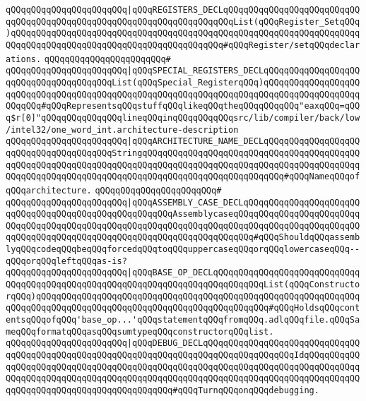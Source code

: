 \verb|qQQqqQQqqQQqqQQqqQQqqQQq|\verb#|qQQqREGISTERS_DECLqQQqqQQqqQQqqQQqqQQqqQQqqQQqqQQqqQQqqQQqqQQqqQQqqQQqqQQqqQQqqQQqqQQqqQQqList(qQQqRegister_SetqQQq)qQQqqQQqqQQqqQQqqQQqqQQqqQQqqQQqqQQqqQQqqQQqqQQqqQQqqQQqqQQqqQQqqQQqqQQqqQQqqQQqqQQqqQQqqQQqqQQqqQQqqQQqqQQqqQQq#\verb|#qQQqRegister/setqQQqdeclarations.|\newline
\verb|qQQqqQQqqQQqqQQqqQQqqQQq#|\newline
\verb|qQQqqQQqqQQqqQQqqQQqqQQq|\verb#|qQQqSPECIAL_REGISTERS_DECLqQQqqQQqqQQqqQQqqQQqqQQqqQQqqQQqqQQqqQQqList(qQQqSpecial_RegisterqQQq)qQQqqQQqqQQqqQQqqQQqqQQqqQQqqQQqqQQqqQQqqQQqqQQqqQQqqQQqqQQqqQQqqQQqqQQqqQQqqQQqqQQqqQQqqQQqqQQq#\verb|#qQQqRepresentsqQQqstuffqQQqlikeqQQqtheqQQqqQQqqQQq"eaxqQQq=qQQq$r[0]"qQQqqQQqqQQqqQQqlineqQQqinqQQqqQQqqQQqsrc/lib/compiler/back/low/intel32/one_word_int.architecture-description|\newline
\verb|qQQqqQQqqQQqqQQqqQQqqQQq|\verb#|qQQqARCHITECTURE_NAME_DECLqQQqqQQqqQQqqQQqqQQqqQQqqQQqqQQqqQQqqQQqStringqQQqqQQqqQQqqQQqqQQqqQQqqQQqqQQqqQQqqQQqqQQqqQQqqQQqqQQqqQQqqQQqqQQqqQQqqQQqqQQqqQQqqQQqqQQqqQQqqQQqqQQqqQQqqQQqqQQqqQQqqQQqqQQqqQQqqQQqqQQqqQQqqQQqqQQqqQQqqQQqqQQqqQQq#\verb|#qQQqNameqQQqofqQQqarchitecture.|\newline
\verb|qQQqqQQqqQQqqQQqqQQqqQQq#|\newline
\verb|qQQqqQQqqQQqqQQqqQQqqQQq|\verb#|qQQqASSEMBLY_CASE_DECLqQQqqQQqqQQqqQQqqQQqqQQqqQQqqQQqqQQqqQQqqQQqqQQqqQQqqQQqAssemblycaseqQQqqQQqqQQqqQQqqQQqqQQqqQQqqQQqqQQqqQQqqQQqqQQqqQQqqQQqqQQqqQQqqQQqqQQqqQQqqQQqqQQqqQQqqQQqqQQqqQQqqQQqqQQqqQQqqQQqqQQqqQQqqQQqqQQqqQQqqQQqqQQq#\verb|#qQQqShouldqQQqassemblyqQQqcodeqQQqbeqQQqforcedqQQqtoqQQquppercaseqQQqorqQQqlowercaseqQQq--qQQqorqQQqleftqQQqas-is?|\newline
\verb|qQQqqQQqqQQqqQQqqQQqqQQq|\verb#|qQQqBASE_OP_DECLqQQqqQQqqQQqqQQqqQQqqQQqqQQqqQQqqQQqqQQqqQQqqQQqqQQqqQQqqQQqqQQqqQQqqQQqqQQqqQQqList(qQQqConstructorqQQq)qQQqqQQqqQQqqQQqqQQqqQQqqQQqqQQqqQQqqQQqqQQqqQQqqQQqqQQqqQQqqQQqqQQqqQQqqQQqqQQqqQQqqQQqqQQqqQQqqQQqqQQqqQQqqQQqqQQq#\verb|#qQQqHoldsqQQqcontentsqQQqofqQQq'base_op...'qQQqstatementqQQqfromqQQq.adlqQQqfile.qQQqSameqQQqformatqQQqasqQQqsumtypeqQQqconstructorqQQqlist.|\newline
\verb|qQQqqQQqqQQqqQQqqQQqqQQq|\verb#|qQQqDEBUG_DECLqQQqqQQqqQQqqQQqqQQqqQQqqQQqqQQqqQQqqQQqqQQqqQQqqQQqqQQqqQQqqQQqqQQqqQQqqQQqqQQqqQQqqQQqIdqQQqqQQqqQQqqQQqqQQqqQQqqQQqqQQqqQQqqQQqqQQqqQQqqQQqqQQqqQQqqQQqqQQqqQQqqQQqqQQqqQQqqQQqqQQqqQQqqQQqqQQqqQQqqQQqqQQqqQQqqQQqqQQqqQQqqQQqqQQqqQQqqQQqqQQqqQQqqQQqqQQqqQQqqQQqqQQqqQQqqQQq#\verb|#qQQqTurnqQQqonqQQqdebugging.|\newline
